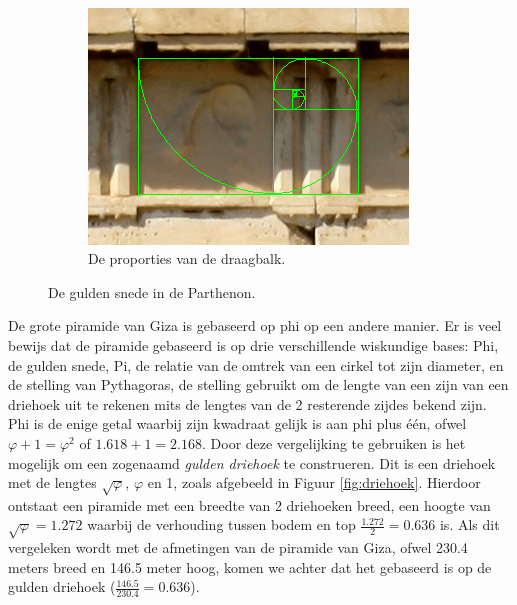 \documentclass{article}
\begin{document}
\begin{figure}[Hh]
\begin{subfigure}[b]{0.3\textwidth}
    \end{subfigure}%
    ~
	\begin{subfigure}[b]{0.45\textwidth}
        \includegraphics[width=\textwidth]{parthenon-beam.png}
		\caption{De proporties van de draagbalk.}
		\label{fig:parthenon-beam}
    \end{subfigure}%
    
    \caption{De gulden snede in de Parthenon.}
    \label{fig:parthenon-phi}
\end{figure}

De grote piramide van Giza is gebaseerd op phi op een andere manier. Er is veel bewijs dat de piramide gebaseerd is op drie verschillende wiskundige bases: Phi, de gulden snede, Pi, de relatie van de omtrek van een cirkel tot zijn diameter, en de stelling van Pythagoras, de stelling gebruikt om de lengte van een zijn van een driehoek uit te rekenen mits de lengtes van de 2 resterende zijdes bekend zijn. Phi is de enige getal waarbij zijn kwadraat gelijk is aan phi plus \'e\'en, ofwel \(\varphi + 1 = \varphi^2\) of \(1.618 + 1 = 2.168\). Door deze vergelijking te gebruiken is het mogelijk om een zogenaamd \textit{gulden driehoek} te construeren. Dit is een driehoek met de lengtes \(\sqrt{\varphi}\), \(\varphi\) en 1, zoals afgebeeld in Figuur \ref{fig:driehoek}. Hierdoor ontstaat een piramide met een breedte van 2 driehoeken breed, een hoogte van \(\sqrt{\varphi} = 1.272\) waarbij de verhouding tussen bodem en top \(\frac{1.272}{2} = 0.636\) is. Als dit vergeleken wordt met de afmetingen van de piramide van Giza, ofwel 230.4 meters breed en 146.5 meter hoog, komen we achter dat het gebaseerd is op de gulden driehoek (\(\frac{146.5}{230.4} = 0.636\)).
\end{document}

